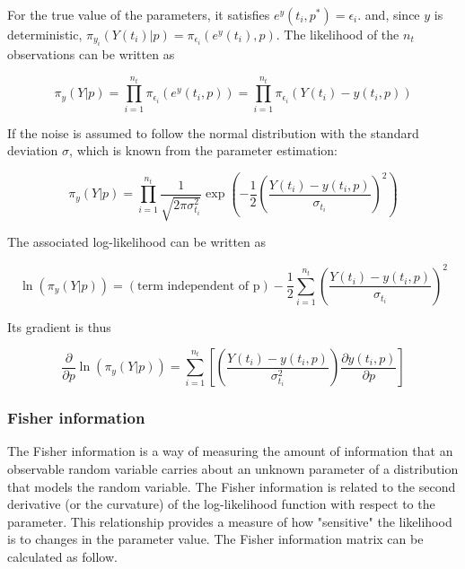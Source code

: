 \documentclass[../Article_Design_of_Experiment.tex]{subfiles}
\begin{document}
	For the true value of the parameters, it satisfies $e^y(t_i, p^*)=\epsilon_i$. and, since $y$ is deterministic, $\pi_{y_i} (Y(t_i)|p) = \pi_{\epsilon_i} (e^y(t_i),p)$. The likelihood of the $n_t$ observations can be written as
	
	{\footnotesize
	\begin{equation}
		\pi_y (Y|p) = \prod_{i=1}^{n_t} \pi_{\epsilon_i}(e^y(t_i,p)) =  \prod_{i=1}^{n_t} \pi_{\epsilon_i}(Y(t_i) - y(t_i, p))
	\end{equation} }
	
	If the noise is assumed to follow the normal distribution with the standard deviation $\sigma$, which is known from the parameter estimation:
	
	{\footnotesize
	\begin{equation}
		\pi_y (Y|p) = \prod_{i=1}^{n_t} \frac{1}{ \sqrt{2\pi\sigma_{t_i}^2} } \exp \left( -\frac{1}{2} \left( \frac{Y(t_i) - y(t_i, p)}{\sigma_{t_i}} \right)^2 \right)
	\end{equation} }
	
	The associated log-likelihood can be written as
	
	{\footnotesize
	\begin{equation}
		\ln (\pi_y (Y|p)) = (\text{term independent of p}) - \frac{1}{2} \sum_{i=1}^{n_t}  \left( \frac{Y(t_i) - y(t_i, p)}{\sigma_{t_i}} \right)^2
	\end{equation} }
	
	Its gradient is thus
	
	{\footnotesize
	\begin{equation}
		\frac{\partial}{\partial p} \ln (\pi_y (Y|p)) =  \sum_{i=1}^{n_t}  \left[ \left( \frac{Y(t_i) - y(t_i, p)}{\sigma_{t_i}^2} \right) \frac{\partial y(t_i, p)}{\partial p} \right]
	\end{equation} }
	
	\subsubsection{Fisher information}
	
	The Fisher information is a way of measuring the amount of information that an observable random variable carries about an unknown parameter of a distribution that models the random variable. The Fisher information is related to the second derivative (or the curvature) of the log-likelihood function with respect to the parameter. This relationship provides a measure of how "sensitive" the likelihood is to changes in the parameter value. The Fisher information matrix can be calculated as follow.
	
\end{document}
